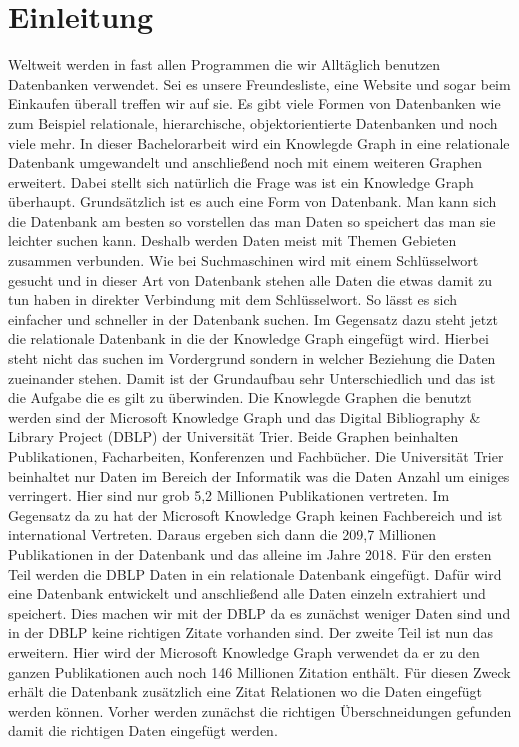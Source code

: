 \documentclass[a4paper,12pt]{article}
\begin{document}
	\tableofcontents
	\section{Einleitung}
	Weltweit werden in fast allen Programmen die wir Alltäglich benutzen Datenbanken verwendet. Sei es unsere Freundesliste, eine Website und sogar beim Einkaufen überall treffen wir auf sie. Es gibt viele Formen von Datenbanken wie  zum Beispiel relationale, hierarchische, objektorientierte Datenbanken und noch viele mehr. In dieser Bachelorarbeit wird ein Knowlegde Graph in eine relationale Datenbank umgewandelt und anschließend noch mit einem weiteren Graphen erweitert. Dabei stellt sich natürlich die Frage was ist ein Knowledge Graph überhaupt. Grundsätzlich ist es auch eine Form von Datenbank. Man kann sich die Datenbank am besten so vorstellen das man Daten so speichert das man sie leichter suchen kann. Deshalb werden Daten meist mit Themen Gebieten zusammen verbunden. Wie bei Suchmaschinen wird mit einem Schlüsselwort gesucht und in dieser Art von Datenbank stehen alle Daten die etwas damit zu tun haben in direkter Verbindung mit dem Schlüsselwort. So lässt es sich einfacher und schneller in der Datenbank suchen. Im Gegensatz dazu steht jetzt die relationale Datenbank in die der Knowledge Graph eingefügt wird. Hierbei steht nicht das suchen im Vordergrund sondern in welcher Beziehung die Daten zueinander stehen. Damit ist der Grundaufbau sehr Unterschiedlich und das ist die Aufgabe die es gilt zu überwinden. Die Knowlegde Graphen die benutzt werden sind der Microsoft Knowledge Graph und das Digital Bibliography \& Library Project (DBLP) der Universität Trier. Beide Graphen beinhalten Publikationen, Facharbeiten, Konferenzen und Fachbücher. Die Universität Trier beinhaltet nur Daten im Bereich der Informatik was die Daten Anzahl um einiges verringert. Hier sind nur grob 5,2 Millionen Publikationen vertreten. Im Gegensatz da zu hat der Microsoft Knowledge Graph keinen Fachbereich und ist international Vertreten. Daraus ergeben sich dann die 209,7 Millionen Publikationen in der Datenbank und das alleine im Jahre 2018. Für den ersten Teil werden die DBLP Daten in ein relationale Datenbank eingefügt. Dafür wird eine Datenbank entwickelt und anschließend alle Daten einzeln extrahiert und speichert. Dies machen wir mit der DBLP da es zunächst weniger Daten sind und in der DBLP keine richtigen Zitate vorhanden sind. Der zweite Teil ist nun das erweitern. Hier wird der Microsoft Knowledge Graph verwendet da er zu den ganzen Publikationen auch noch 146 Millionen Zitation enthält. Für diesen Zweck erhält die Datenbank zusätzlich eine Zitat Relationen wo die Daten eingefügt werden können. Vorher werden zunächst die richtigen Überschneidungen gefunden damit die richtigen Daten eingefügt werden.
	
\end{document}
